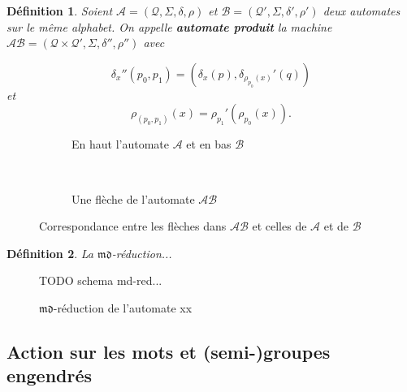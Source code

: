\documentclass[11pt,a4paper]{article}
\newtheorem{definition}{Définition}
\begin{document}
\begin{definition}
  \label{def:produit}
  Soient $\mathcal{A} = \left(\mathcal{Q}, \Sigma, \delta, \rho\right)$ et $\mathcal{B} = \left(\mathcal{Q'}, \Sigma, \delta', \rho'\right)$ deux automates sur le même alphabet. On appelle \textbf{\textit{automate produit}} la machine $\mathcal{AB} = \left(\mathcal{Q}\times\mathcal{Q'}, \Sigma, \delta'', \rho''\right)$ avec

\[ \delta_x''(p_0, p_1) = (\delta_x(p), \delta_{\rho_{p_0}(x)}'(q))\]
et
\[ \rho_{(p_0,p_1)}(x) = \rho_{p_1}'(\rho_{p_0}(x)). \]
\end{definition}

\begin{figure}[h!]
  \begin{subfigure}[b]{0.5\textwidth}
    \centering
    \caption{En haut l'automate $\mathcal{A}$ et en bas $\mathcal{B}$}
  \end{subfigure}
  ~
  \begin{subfigure}[b]{0.5\textwidth}
    \centering
    \caption{Une flèche de l'automate $\mathcal{AB}$}
  \end{subfigure}
  \caption{Correspondance entre les flèches dans $\mathcal{AB}$ et celles de $\mathcal{A}$ et de $\mathcal{B}$}
\end{figure}

\begin{definition}
  La $\mathfrak{md}$-réduction...
\end{definition}

\begin{figure}[h!]
  TODO schema md-red...
  \caption{$\mathfrak{md}$-réduction de l'automate xx}
\end{figure}

\subsection{Action sur les mots et (semi-)groupes engendrés\label{sec:action}}
\end{document}
